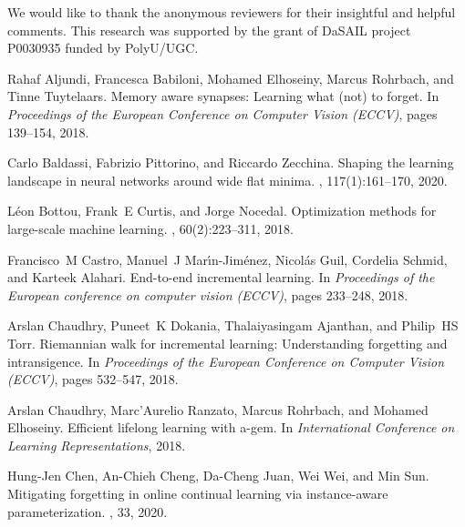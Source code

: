 \documentclass{article}
\begin{document}
 

\newpage
\begin{ack}
We would like to thank the anonymous reviewers for their insightful and helpful comments. This research was supported by the grant of DaSAIL project P0030935 funded by PolyU/UGC.
\end{ack}

\begin{thebibliography}{10}

Rahaf Aljundi, Francesca Babiloni, Mohamed Elhoseiny, Marcus Rohrbach, and
  Tinne Tuytelaars.
\newblock Memory aware synapses: Learning what (not) to forget.
\newblock In {\em Proceedings of the European Conference on Computer Vision
  (ECCV)}, pages 139--154, 2018.

Carlo Baldassi, Fabrizio Pittorino, and Riccardo Zecchina.
\newblock Shaping the learning landscape in neural networks around wide flat
  minima.
, 117(1):161--170, 2020.

L{\'e}on Bottou, Frank~E Curtis, and Jorge Nocedal.
\newblock Optimization methods for large-scale machine learning.
, 60(2):223--311, 2018.

Francisco~M Castro, Manuel~J Mar{\'\i}n-Jim{\'e}nez, Nicol{\'a}s Guil, Cordelia
  Schmid, and Karteek Alahari.
\newblock End-to-end incremental learning.
\newblock In {\em Proceedings of the European conference on computer vision
  (ECCV)}, pages 233--248, 2018.

Arslan Chaudhry, Puneet~K Dokania, Thalaiyasingam Ajanthan, and Philip~HS Torr.
\newblock Riemannian walk for incremental learning: Understanding forgetting
  and intransigence.
\newblock In {\em Proceedings of the European Conference on Computer Vision
  (ECCV)}, pages 532--547, 2018.

Arslan Chaudhry, Marc’Aurelio Ranzato, Marcus Rohrbach, and Mohamed
  Elhoseiny.
\newblock Efficient lifelong learning with a-gem.
\newblock In {\em International Conference on Learning Representations}, 2018.

Hung-Jen Chen, An-Chieh Cheng, Da-Cheng Juan, Wei Wei, and Min Sun.
\newblock Mitigating forgetting in online continual learning via instance-aware
  parameterization.
, 33, 2020.


\end{thebibliography}
\end{document}
